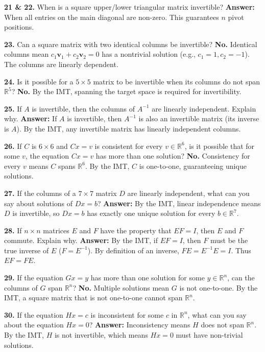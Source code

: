 \documentclass[11pt]{article}
\begin{document}
\textbf{21 \& 22.} When is a square upper/lower triangular matrix invertible?
\textbf{Answer:} When all entries on the main diagonal are non-zero. This guarantees $n$ pivot positions.

\textbf{23.} Can a square matrix with two identical columns be invertible?
\textbf{No.} Identical columns mean $c_1 \mathbf{v}_1 + c_2 \mathbf{v}_2 = 0$ has a nontrivial solution (e.g., $c_1=1, c_2=-1$). The columns are linearly dependent.

\textbf{24.} Is it possible for a $5 \times 5$ matrix to be invertible when its columns do not span $\mathbb{R}^5$?
\textbf{No.} By the IMT, spanning the target space is required for invertibility.

\textbf{25.} If $A$ is invertible, then the columns of $A^{-1}$ are linearly independent. Explain why.
\textbf{Answer:} If $A$ is invertible, then $A^{-1}$ is also an invertible matrix (its inverse is $A$). By the IMT, any invertible matrix has linearly independent columns.

\textbf{26.} If $C$ is $6 \times 6$ and $Cx=v$ is consistent for every $v \in \mathbb{R}^6$, is it possible that for some $v$, the equation $Cx=v$ has more than one solution?
\textbf{No.} Consistency for every $v$ means $C$ spans $\mathbb{R}^6$. By the IMT, $C$ is one-to-one, guaranteeing unique solutions.

\textbf{27.} If the columns of a $7 \times 7$ matrix $D$ are linearly independent, what can you say about solutions of $Dx=b$?
\textbf{Answer:} By the IMT, linear independence means $D$ is invertible, so $Dx=b$ has exactly one unique solution for every $b \in \mathbb{R}^7$.

\textbf{28.} If $n \times n$ matrices $E$ and $F$ have the property that $EF=I$, then $E$ and $F$ commute. Explain why.
\textbf{Answer:} By the IMT, if $EF=I$, then $F$ must be the true inverse of $E$ ($F = E^{-1}$). By definition of an inverse, $FE = E^{-1}E = I$. Thus $EF = FE$.

\textbf{29.} If the equation $Gx=y$ has more than one solution for some $y \in \mathbb{R}^n$, can the columns of $G$ span $\mathbb{R}^n$?
\textbf{No.} Multiple solutions mean $G$ is not one-to-one. By the IMT, a square matrix that is not one-to-one cannot span $\mathbb{R}^n$.

\textbf{30.} If the equation $Hx=c$ is inconsistent for some $c$ in $\mathbb{R}^n$, what can you say about the equation $Hx=0$?
\textbf{Answer:} Inconsistency means $H$ does not span $\mathbb{R}^n$. By the IMT, $H$ is not invertible, which means $Hx=0$ must have non-trivial solutions.
\end{document}
